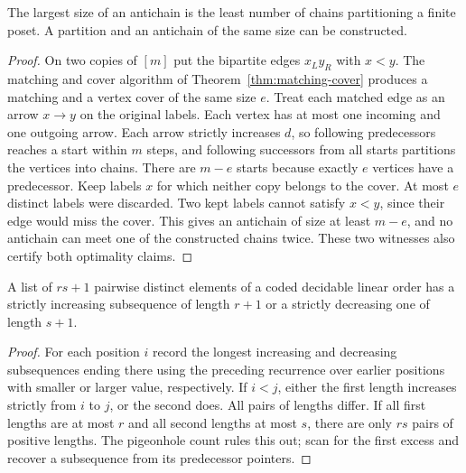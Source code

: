 \begin{theorem}\label{result36}
The largest size of an antichain is the least number of chains partitioning
a finite poset. A partition and an antichain of the same size can be constructed.
\end{theorem}
\begin{proof}
On two copies of \([m]\) put the bipartite edges \(x_Ly_R\) with \(x<y\).
The matching and cover algorithm of Theorem~\ref{thm:matching-cover}
produces a matching and a vertex cover of the same size \(e\).
Treat each matched edge as an arrow \(x\to y\) on the original labels.
Each vertex has at most one incoming and one outgoing arrow. Each arrow
strictly increases \(d\), so following predecessors reaches a start
within \(m\) steps, and following successors from all starts partitions
the vertices into chains. There are \(m-e\) starts because exactly \(e\)
vertices have a predecessor. Keep labels \(x\) for which neither copy
belongs to the cover. At most \(e\) distinct labels were discarded.
Two kept labels cannot satisfy \(x<y\), since their edge would miss the
cover. This gives an antichain of size at least \(m-e\), and no antichain
can meet one of the constructed chains twice. These two witnesses
also certify both optimality claims.
\end{proof}

\begin{corollary}\label{result37}
A list of \(rs+1\) pairwise distinct elements of a coded decidable linear order has a strictly increasing
subsequence of length \(r+1\) or a strictly decreasing one of length \(s+1\).
\end{corollary}
\begin{proof}
For each position \(i\) record the longest increasing and decreasing
subsequences ending there using the preceding recurrence over earlier
positions with smaller or larger value, respectively. If \(i<j\), either
the first length increases strictly from \(i\) to \(j\), or the second
does. All pairs of lengths differ. If all first lengths are at most \(r\)
and all second lengths at most \(s\), there are only \(rs\) pairs of
positive lengths. The pigeonhole count rules this out; scan for the first
excess and recover a subsequence from its predecessor pointers.
\end{proof}

